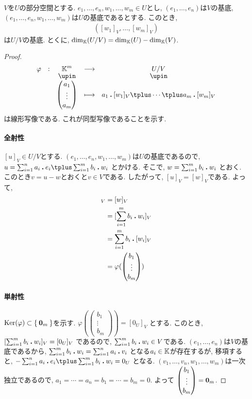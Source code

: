 \begin{theorem}
  \label{thm:dim:quotient}
  $V$を$U$の部分空間とする.
  $e_1,\ldots, e_n,w_1,\ldots,w_m\in U$とし,
  $(e_1,\ldots, e_n)$は$V$の基底,
  $(e_1,\ldots, e_n,w_1,\ldots, w_m)$は$U$の基底であるとする.
  このとき,
  \begin{align*}
    ([w_1]_V,\ldots, [w_m]_V)
  \end{align*}
  は$U/V$の基底.
  とくに, $\dim_{\mathbb{K}}(U/V)=\dim_{\mathbb{K}}(U)-\dim_{\mathbb{K}}(V)$.
\end{theorem}
\begin{proof}
  \begin{align*}
    \shazo{\varphi}{\KK^m}{U/V}
          {\begin{pmatrix}a_1\\\vdots\\a_m\end{pmatrix}}
          {a_1\act [w_1]_V\plus \cdots \plus a_m\act [w_m]_V}
  \end{align*}
  は線形写像である.
  これが同型写像であることを示す.
  \paragraph{全射性}
  $[u]_V\in U/V$とする.
  $(e_1,\ldots, e_n,w_1,\ldots, w_m)$は$U$の基底であるので,
  $u=\sum_{i=1}^n a_i\act e_i\plus\sum_{i=1}^m b_i \act w_i$
  とかける.
  そこで,
  $w=\sum_{i=1}^m b_i \mathbin{\boldsymbol{.}} w_i$
  とおく.
  このとき$v=u-w$とおくと$v\in V$である.
  したがって, $[u]_V=[w]_V$である.
  よって,
  \begin{align*}
    [u]_V
    &=[w]_V\\
    &=[\sum_{i=1}^m b_i \act w_i]_V\\
    &=\sum_{i=1}^m b_i \act[ w_i]_V\\
    &=\varphi(\begin{pmatrix}b_1\\\vdots\\b_m\end{pmatrix})\\
  \end{align*}
  \paragraph{単射性}
  $\operatorname{Ker}(\varphi)\subset\Set{\boldsymbol{0}_m}$を示す.
  $\varphi(\begin{pmatrix}b_1\\\vdots\\b_m\end{pmatrix})=[0_U]_V$
  とする.
  このとき,
  $[\sum_{i=1}^m b_i \mathbin{\boldsymbol{.}} w_i]_V=[0_U]_V$
  であるので, $\sum_{i=1}^m b_i \mathbin{\boldsymbol{.}} w_i\in V$である.
  $(e_1,\ldots, e_n)$は$V$の基底であるから,
  $\sum_{i=1}^m b_i \mathbin{\boldsymbol{.}} w_i=\sum_{i=1}^n a_i\mathbin{\boldsymbol{.}} v_i$
  となる$a_i\in \mathbb{K}$が存在するが,
  移項すると,
  $-\sum_{i=1}^n a_i\act e_i\plus\sum_{i=1}^m b_i \act w_i=0_U$
  となる.
  $(v_1,\ldots, v_n,w_1,\ldots, w_m)$は一次独立であるので,
  $a_1=\cdots=a_n=b_1=\cdots=b_m=0$.
  よって
  $\begin{pmatrix}b_1\\\vdots\\b_m\end{pmatrix}=\boldsymbol{0}_m$.
\end{proof}

